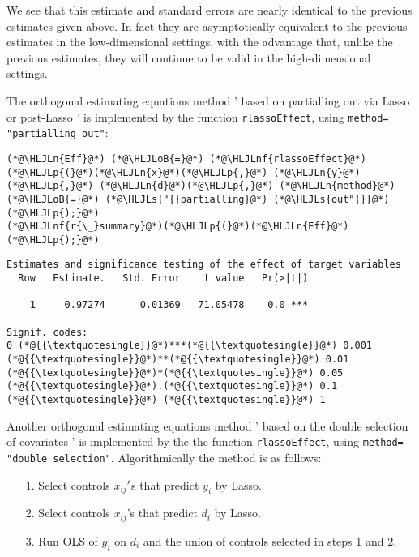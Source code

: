 \documentclass[12pt,a4paper]{article}
\newcommand{\HLJLn}[1]{#1}
\newcommand{\HLJLnf}[1]{\textcolor[RGB]{66,102,213}{#1}}
\newcommand{\HLJLs}[1]{\textcolor[RGB]{201,61,57}{#1}}
\newcommand{\HLJLoB}[1]{\textcolor[RGB]{102,102,102}{\textbf{#1}}}
\newcommand{\HLJLp}[1]{#1}
\begin{document}
We see that this estimate and standard errors are nearly identical to the previous estimates given above. In fact they are asymptotically equivalent to the previous estimates in the low-dimensional settings, with the advantage that, unlike the previous estimates, they will continue to be valid in the high-dimensional settings.

The orthogonal estimating equations method ' based on partialling out via Lasso or post-Lasso ' is implemented by the function \texttt{rlassoEffect}, using \texttt{method= "partialling out"}:


\begin{lstlisting}
(*@\HLJLn{Eff}@*) (*@\HLJLoB{=}@*) (*@\HLJLnf{rlassoEffect}@*)(*@\HLJLp{(}@*)(*@\HLJLn{x}@*)(*@\HLJLp{,}@*) (*@\HLJLn{y}@*)(*@\HLJLp{,}@*) (*@\HLJLn{d}@*)(*@\HLJLp{,}@*) (*@\HLJLn{method}@*) (*@\HLJLoB{=}@*) (*@\HLJLs{"{}partialling}@*) (*@\HLJLs{out"{}}@*)(*@\HLJLp{);}@*)
(*@\HLJLnf{r{\_}summary}@*)(*@\HLJLp{(}@*)(*@\HLJLn{Eff}@*)(*@\HLJLp{);}@*)
\end{lstlisting}

\begin{lstlisting}
Estimates and significance testing of the effect of target variables
  Row   Estimate.   Std. Error    t value   Pr(>|t|)

    1     0.97274      0.01369   71.05478    0.0 ***
---
Signif. codes:
0 (*@{{\textquotesingle}}@*)***(*@{{\textquotesingle}}@*) 0.001 (*@{{\textquotesingle}}@*)**(*@{{\textquotesingle}}@*) 0.01 (*@{{\textquotesingle}}@*)*(*@{{\textquotesingle}}@*) 0.05 (*@{{\textquotesingle}}@*).(*@{{\textquotesingle}}@*) 0.1 (*@{{\textquotesingle}}@*) (*@{{\textquotesingle}}@*) 1
\end{lstlisting}


Another orthogonal estimating equations method ' based on the double selection of covariates ' is implemented by the the function \texttt{rlassoEffect}, using \texttt{method= "double selection"}. Algorithmically the method is as follows:

\begin{itemize}
\item[1. ] Select controls $x_{ij}$\ensuremath{\rq}s that predict $y_i$ by Lasso.


\item[2. ] Select controls $x_{ij}$'s that predict $d_i$ by Lasso.


\item[3. ] Run OLS of $y_i$ on $d_i$ and the union of controls selected in steps 1 and 2.

\end{itemize}
\end{document}

